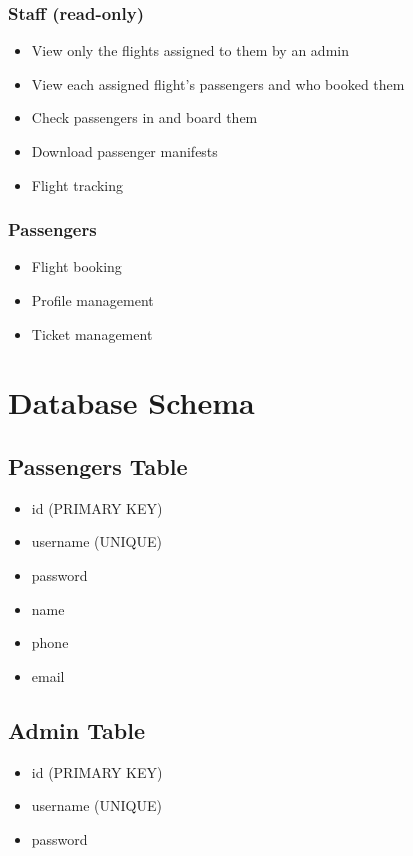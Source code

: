\documentclass{article}
\begin{document}
\subsubsection{Staff (read-only)}
\begin{itemize}
    \item View only the flights assigned to them by an admin
    \item View each assigned flight's passengers and who booked them
    \item Check passengers in and board them
    \item Download passenger manifests
    \item Flight tracking
\end{itemize}

\subsubsection{Passengers}
\begin{itemize}
    \item Flight booking
    \item Profile management
    \item Ticket management
\end{itemize}

\section{Database Schema}
\subsection{Passengers Table}
\begin{itemize}
    \item id (PRIMARY KEY)
    \item username (UNIQUE)
    \item password
    \item name
    \item phone
    \item email
\end{itemize}

\subsection{Admin Table}
\begin{itemize}
    \item id (PRIMARY KEY)
    \item username (UNIQUE)
    \item password
\end{itemize}
\end{document}
